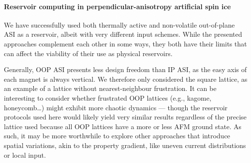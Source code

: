 \paragraph{Reservoir computing in perpendicular-anisotropy artificial spin ice}
We have successfully used both thermally active and non-volatile out-of-plane ASI as a reservoir, albeit with very different input schemes.
While the presented approaches complement each other in some ways, they both have their limits that can affect the viability of their use as physical reservoirs. \\\par

Generally, OOP ASI presents less design freedom than IP ASI, as the easy axis of each magnet is always vertical.
We therefore only considered the square lattice, as an example of a lattice without nearest-neighbour frustration.
It can be interesting to consider whether frustrated OOP lattices (e.g., kagome, honeycomb\dots) might exhibit more chaotic dynamics --- though the reservoir protocols used here would likely yield very similar results regardless of the precise lattice used because all OOP lattices have a more or less AFM ground state.
As such, it may be more worthwhile to explore other approaches that introduce spatial variations, akin to the property gradient, like uneven current distributions or local input. \\\par

